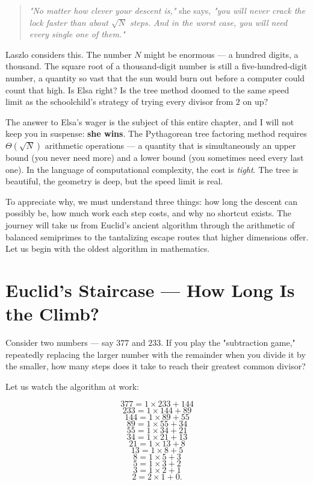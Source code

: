 \documentclass[11pt,twoside,openright]{book}
\theoremstyle{definition}
\theoremstyle{remark}
\begin{document}
\begin{quote}
\textit{"No matter how clever your descent is,"} she says, \textit{"you will never crack the lock faster than about $\sqrt{N}$ steps. And in the worst case, you will need every single one of them."}
\end{quote}
Laszlo considers this. The number $N$ might be enormous --- a hundred digits, a thousand. The square root of a thousand-digit number is still a five-hundred-digit number, a quantity so vast that the sun would burn out before a computer could count that high. Is Elsa right? Is the tree method doomed to the same speed limit as the schoolchild's strategy of trying every divisor from $2$ on up?

The answer to Elsa's wager is the subject of this entire chapter, and I will not keep you in suspense: \textbf{she wins}. The Pythagorean tree factoring method requires $\Theta(\sqrt{N})$ arithmetic operations --- a quantity that is simultaneously an upper bound (you never need more) and a lower bound (you sometimes need every last one). In the language of computational complexity, the cost is \textit{tight}. The tree is beautiful, the geometry is deep, but the speed limit is real.

To appreciate why, we must understand three things: how long the descent can possibly be, how much work each step costs, and why no shortcut exists. The journey will take us from Euclid's ancient algorithm through the arithmetic of balanced semiprimes to the tantalizing escape routes that higher dimensions offer. Let us begin with the oldest algorithm in mathematics.



\section{Euclid's Staircase --- How Long Is the Climb?}

Consider two numbers --- say $377$ and $233$. If you play the "subtraction game," repeatedly replacing the larger number with the remainder when you divide it by the smaller, how many steps does it take to reach their greatest common divisor?

Let us watch the algorithm at work:

\[377 = 1 \times 233 + 144\]
\[233 = 1 \times 144 + 89\]
\[144 = 1 \times 89 + 55\]
\[89 = 1 \times 55 + 34\]
\[55 = 1 \times 34 + 21\]
\[34 = 1 \times 21 + 13\]
\[21 = 1 \times 13 + 8\]
\[13 = 1 \times 8 + 5\]
\[8 = 1 \times 5 + 3\]
\[5 = 1 \times 3 + 2\]
\[3 = 1 \times 2 + 1\]
\[2 = 2 \times 1 + 0.\]
\end{document}

